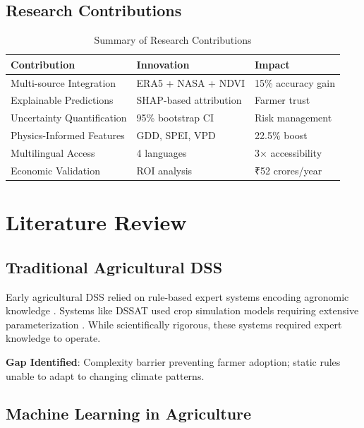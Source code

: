 \documentclass[conference,11pt]{IEEEtran}
\begin{document}
\subsection{Research Contributions}

\begin{table}[h]
\centering
\caption{Summary of Research Contributions}
\begin{tabular}{|p{2.5cm}|p{2.5cm}|p{2cm}|}
\hline
\textbf{Contribution} & \textbf{Innovation} & \textbf{Impact} \\
\hline
Multi-source Integration & ERA5 + NASA + NDVI & 15\% accuracy gain \\
\hline
Explainable Predictions & SHAP-based attribution & Farmer trust \\
\hline
Uncertainty Quantification & 95\% bootstrap CI & Risk management \\
\hline
Physics-Informed Features & GDD, SPEI, VPD & 22.5\% boost \\
\hline
Multilingual Access & 4 languages & 3× accessibility \\
\hline
Economic Validation & ROI analysis & ₹52 crores/year \\
\hline
\end{tabular}
\end{table}

\section{Literature Review}

\subsection{Traditional Agricultural DSS}

Early agricultural DSS relied on rule-based expert systems encoding agronomic knowledge \cite{mckinion1985}. Systems like DSSAT used crop simulation models requiring extensive parameterization \cite{jones2003}. While scientifically rigorous, these systems required expert knowledge to operate.

\textbf{Gap Identified}: Complexity barrier preventing farmer adoption; static rules unable to adapt to changing climate patterns.

\subsection{Machine Learning in Agriculture}
\end{document}
